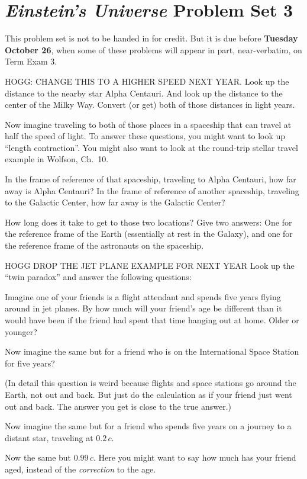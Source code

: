 \documentclass[12pt, letterpaper]{article}
\begin{document}
\section*{\textsl{Einstein's Universe} Problem Set 3}

This problem set is not to be handed in for credit. But it is due
before \textbf{Tuesday October 26}, when some of these problems
will appear in part, near-verbatim, on Term Exam 3.

\begin{problem}
HOGG: CHANGE THIS TO A HIGHER SPEED NEXT YEAR.
Look up the distance to the nearby star Alpha Centauri. And look up the
distance to the center of the Milky Way. Convert (or get) both of those
distances in light years.

Now imagine traveling to both of those places in a spaceship that can
travel at half the speed of light. To answer these questions, you
might want to look up ``length contraction''. You might also want to
look at the round-trip stellar travel example in Wolfson, Ch.~10.

In the frame of reference of that spaceship, traveling to Alpha
Centauri, how far away is Alpha Centauri? In the frame of reference of
another spaceship, traveling to the Galactic Center, how far away is
the Galactic Center?

How long does it take to get to those two locations? Give two answers:
One for the reference frame of the Earth (essentially at rest in the
Galaxy), and one for the reference frame of the astronauts on the
spaceship.
\end{problem}

\begin{problem}
HOGG DROP THE JET PLANE EXAMPLE FOR NEXT YEAR
Look up the ``twin paradox'' and answer the following questions:

Imagine one of your friends is a flight attendant and spends five years
flying around in jet planes. By how much will your friend's age be different
than it would have been if the friend had spent that time hanging out
at home. Older or younger?

Now imagine the same but for a friend who is on the International
Space Station for five years?

(In detail this question is weird because flights and space stations
go around the Earth, not out and back. But just do the calculation as
if your friend just went out and back. The answer you get is close to
the true answer.)

Now imagine the same but for a friend who spends five years on a journey
to a distant star, traveling at $0.2\,c$.

Now the same but $0.99\,c$. Here you might want to say how much has your
friend aged, instead of the \emph{correction} to the age.
\end{problem}
\end{document}
